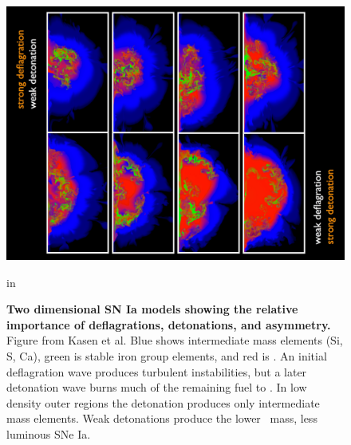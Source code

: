\documentclass{nature1}
\begin{document}
\begin{figure}
\includegraphics[width=7in]{kasen_f1.pdf} 
\caption{\textsf{{\bf \textsf{Two dimensional SN Ia models showing the relative
    importance of deflagrations, detonations, and asymmetry.}}  Figure
  from Kasen et al.\citep{2009Natur.460..869K} Blue shows
  intermediate mass elements (Si, S, Ca), green is stable iron group
  elements, and red is \Ni .  An initial deflagration wave produces
  turbulent instabilities, but a later detonation wave burns much of
  the remaining fuel to \Ni .  In low density outer regions the
  detonation produces only intermediate mass elements.  Weak detonations produce the lower
  \Ni\ mass, less luminous SNe Ia.}}
\label{kasen}
 in
\end{figure}
\end{document}
